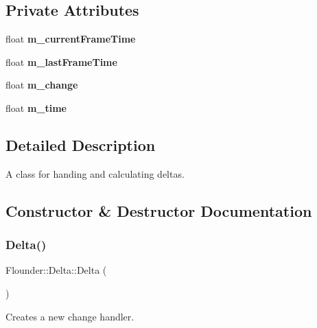 \subsection*{Private Attributes}
\begin{DoxyCompactItemize}
\item 
\mbox{\label{class_flounder_1_1_delta_ae29d73207a1dc02872fc9cc8c9ad2fe2}} 
float {\bfseries m\+\_\+current\+Frame\+Time}
\item 
\mbox{\label{class_flounder_1_1_delta_abed75e7c0498e5d9cfbe7f6ab8222952}} 
float {\bfseries m\+\_\+last\+Frame\+Time}
\item 
\mbox{\label{class_flounder_1_1_delta_a168761d106d437457db6ebdf1ae7efec}} 
float {\bfseries m\+\_\+change}
\item 
\mbox{\label{class_flounder_1_1_delta_a9684afac740002f755717be7b680e225}} 
float {\bfseries m\+\_\+time}
\end{DoxyCompactItemize}


\subsection{Detailed Description}
A class for handing and calculating deltas. 



\subsection{Constructor \& Destructor Documentation}
\mbox{\label{class_flounder_1_1_delta_a9fc48dafff86ce24ac4f108aa397b8c7}} 
\subsubsection{\texorpdfstring{Delta()}{Delta()}}
{\footnotesize\ttfamily Flounder\+::\+Delta\+::\+Delta (\begin{DoxyParamCaption}{ }\end{DoxyParamCaption})}



Creates a new change handler. 

